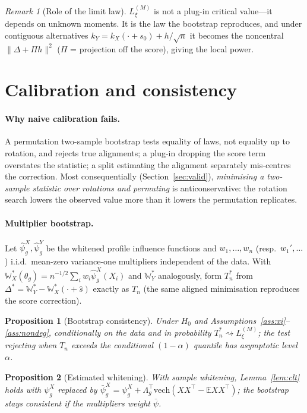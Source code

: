\documentclass[]{interact}
\theoremstyle{plain}
\newtheorem{proposition}{Proposition}
\theoremstyle{remark}
\newtheorem{remark}{Remark}
\newcommand{\E}{\mathbb{E}}
\newcommand{\weakto}{\rightsquigarrow}
\newcommand{\Gp}{\mathbb{W}}
\begin{document}
\begin{remark}[Role of the limit law]
$L_\xi^{(M)}$ is not a plug-in critical value---it depends on unknown moments. It
is the law the bootstrap reproduces, and under contiguous alternatives
$k_Y=k_X(\cdot+s_0)+h/\sqrt n$ it becomes the noncentral $\|\Delta+\Pi h\|^2$ ($\Pi$
= projection off the score), giving the local power.
\end{remark}

\section{Calibration and consistency}
\label{sec:stat}

\paragraph{Why naive calibration fails.} A permutation two-sample bootstrap tests
equality of laws, not equality up to rotation, and rejects true alignments; a
plug-in dropping the score term overstates the statistic; a split estimating the
alignment separately mis-centres the correction. Most consequentially
(Section~\ref{sec:valid}), \emph{minimising a two-sample statistic over rotations
and permuting} is anticonservative: the rotation search lowers the observed value
more than it lowers the permutation replicates.

\paragraph{Multiplier bootstrap.} Let $\hat\psi^X_g,\hat\psi^Y_g$ be the whitened
profile influence functions and $w_1,\dots,w_n$ (resp.\ $w_1',\dots$) i.i.d.\
mean-zero variance-one multipliers independent of the data. With
$\Gp_X^{*}(\theta_g)=n^{-1/2}\sum_i w_i\hat\psi^X_g(X_i)$ and $\Gp_Y^{*}$
analogously, form $T_n^{*}$ from $\Delta^{*}=\Gp_Y^{*}-\Gp_X^{*}(\cdot+\hat s)$
exactly as $T_n$ (the same aligned minimisation reproduces the score correction).

\begin{proposition}[Bootstrap consistency]
\label{prop:boot}
Under $H_0$ and Assumptions~\ref{ass:xi}--\ref{ass:nondeg}, conditionally on the
data and in probability $T_n^{*}\weakto L_\xi^{(M)}$; the test rejecting when $T_n$
exceeds the conditional $(1-\alpha)$ quantile has asymptotic level $\alpha$.
\end{proposition}

\begin{proposition}[Estimated whitening]
\label{prop:white}
With sample whitening, Lemma~\ref{lem:clt} holds with $\psi^X_g$ replaced by
$\bar\psi^X_g=\psi^X_g+\Lambda_g^\top\mathrm{vech}(XX^\top-\E XX^\top)$; the
bootstrap stays consistent if the multipliers weight $\bar\psi$.
\end{proposition}
\end{document}
